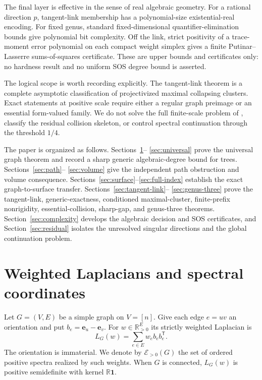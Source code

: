 \documentclass[11pt,reqno]{amsart}
\theoremstyle{definition}
\theoremstyle{remark}
\newcommand{\one}{\mathbf 1}
\newcommand{\R}{\mathbb R}
\newcommand{\Epos}{\mathcal E_{>0}}
\begin{document}
The final layer is effective in the sense of real algebraic geometry.  For a
rational direction $p$, tangent-link membership has a polynomial-size
existential-real encoding.  For fixed genus, standard fixed-dimensional
quantifier-elimination bounds give polynomial bit complexity.  Off the link,
strict positivity of a trace-moment error polynomial on each compact weight
simplex gives a finite Putinar--Lasserre sums-of-squares certificate.  These
are upper bounds and certificates only: no hardness result and no uniform SOS
degree bound is asserted.

The logical scope is worth recording explicitly.  The tangent-link theorem is
a complete asymptotic classification of projectivized maximal collapsing
clusters.  Exact statements at positive scale require either a regular graph
preimage or an essential form-valued family.  We do not solve the full
finite-scale problem of \cite[Question~1]{EJT2026}, classify the residual
collision skeleton, or control spectral continuation through the threshold
$1/4$.

The paper is organized as follows.  Sections~\ref{sec:prelim}--
\ref{sec:universal} prove the universal graph theorem and record a sharp
generic algebraic-degree bound for trees.  Sections~\ref{sec:path}--
\ref{sec:volume} give the independent path obstruction and volume consequence.
Sections~\ref{sec:surface}--\ref{sec:full-index} establish the exact
graph-to-surface transfer.  Sections~\ref{sec:tangent-link}--
\ref{sec:genus-three} prove the tangent-link, generic-exactness, conditioned
maximal-cluster, finite-prefix nonrigidity, essential-collision, sharp-gap,
and genus-three theorems.  Section~\ref{sec:complexity}
develops the algebraic decision and SOS certificates, and
Section~\ref{sec:residual} isolates the unresolved singular directions and
the global continuation problem.

\section{Weighted Laplacians and spectral coordinates}\label{sec:prelim}

Let $G=(V,E)$ be a simple graph on $V=[n]$.  Give each edge $e=uv$ an
orientation and put $b_e=\mathbf e_u-\mathbf e_v$.  For
$w\in\R_{>0}^{E}$ its strictly weighted Laplacian is
\begin{equation}\label{eq:weighted-L}
 L_G(w)=\sum_{e\in E}w_eb_eb_e^{\mathsf T}.
\end{equation}
The orientation is immaterial.  We denote by $\Epos(G)$ the set of ordered
positive spectra realized by such weights.  When $G$ is connected,
$L_G(w)$ is positive semidefinite with kernel $\R\one$.
\end{document}
